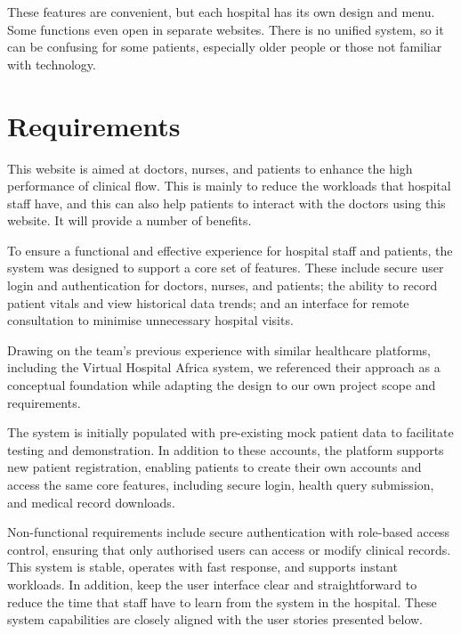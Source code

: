 These features are convenient, but each hospital has its own design and menu. Some functions even open in separate websites. There is no unified system, so it can be confusing for some patients, especially older people or those not familiar with technology.


\clearpage


\clearpage
\section{Requirements}
\label{sec:requirements}

This website is aimed at doctors, nurses, and patients to enhance the high performance of clinical flow. This is mainly to reduce the workloads that hospital staff have, and this can also help patients to interact with the doctors using this website. It will provide a number of benefits.

To ensure a functional and effective experience for hospital staff and patients, the system was designed to support a core set of features. These include secure user login and authentication for doctors, nurses, and patients; the ability to record patient vitals and view historical data trends; and an interface for remote consultation to minimise unnecessary hospital visits.

Drawing on the team’s previous experience with similar healthcare platforms, including the Virtual Hospital Africa system, we referenced their approach as a conceptual foundation while adapting the design to our own project scope and requirements.

The system is initially populated with pre-existing mock patient data to facilitate testing and demonstration. In addition to these accounts, the platform supports new patient registration, enabling patients to create their own accounts and access the same core features, including secure login, health query submission, and medical record downloads.

Non-functional requirements include secure authentication with role-based access control, ensuring that only authorised users can access or modify clinical records. This system is stable, operates with fast response, and supports instant workloads. In addition, keep the user interface clear and straightforward to reduce the time that staff have to learn from the system in the hospital. These system capabilities are closely aligned with the user stories presented below.

